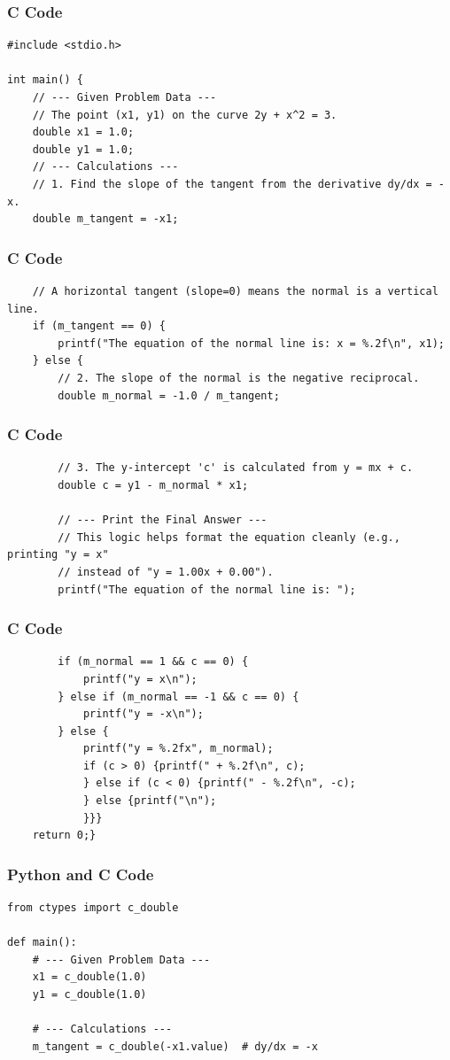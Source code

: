 \documentclass{beamer}
\begin{document}
\begin{frame}[fragile]
\frametitle{C Code}
\begin{lstlisting}
#include <stdio.h>

int main() {
    // --- Given Problem Data ---
    // The point (x1, y1) on the curve 2y + x^2 = 3.
    double x1 = 1.0;
    double y1 = 1.0;
    // --- Calculations ---
    // 1. Find the slope of the tangent from the derivative dy/dx = -x.
    double m_tangent = -x1;
\end{lstlisting}
\end{frame}

\begin{frame}[fragile]
\frametitle{C Code}
\begin{lstlisting}
    // A horizontal tangent (slope=0) means the normal is a vertical line.
    if (m_tangent == 0) {
        printf("The equation of the normal line is: x = %.2f\n", x1);
    } else {
        // 2. The slope of the normal is the negative reciprocal.
        double m_normal = -1.0 / m_tangent;
\end{lstlisting}
\end{frame}

\begin{frame}[fragile]
\frametitle{C Code}
\begin{lstlisting}
        // 3. The y-intercept 'c' is calculated from y = mx + c.
        double c = y1 - m_normal * x1;

        // --- Print the Final Answer ---
        // This logic helps format the equation cleanly (e.g., printing "y = x"
        // instead of "y = 1.00x + 0.00").
        printf("The equation of the normal line is: ");
\end{lstlisting}
\end{frame}

\begin{frame}[fragile]
\frametitle{C Code}
\begin{lstlisting}
        if (m_normal == 1 && c == 0) {
            printf("y = x\n");
        } else if (m_normal == -1 && c == 0) {
            printf("y = -x\n");
        } else {
            printf("y = %.2fx", m_normal);
            if (c > 0) {printf(" + %.2f\n", c);
            } else if (c < 0) {printf(" - %.2f\n", -c);
            } else {printf("\n");
            }}}
    return 0;}
\end{lstlisting}
\end{frame}

\begin{frame}[fragile]
\frametitle{Python and C Code}
\begin{lstlisting}
from ctypes import c_double

def main():
    # --- Given Problem Data ---
    x1 = c_double(1.0)
    y1 = c_double(1.0)

    # --- Calculations ---
    m_tangent = c_double(-x1.value)  # dy/dx = -x
\end{lstlisting}
\end{frame}
\end{document}
